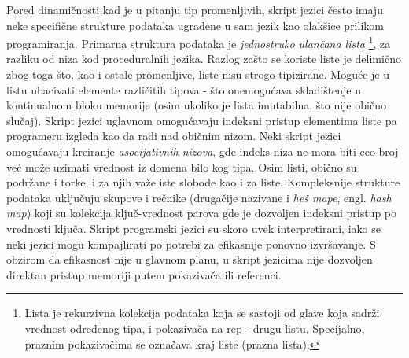 Pored dinamičnosti kad je u pitanju tip promenljivih, skript jezici često imaju neke specifične strukture podataka ugrađene u sam jezik kao olakšice prilikom programiranja. Primarna struktura podataka je \emph{jednostruko ulančana lista} \footnote{Lista je rekurzivna kolekcija podataka koja se sastoji od glave koja sadrži vrednost određenog tipa, i pokazivača na rep - drugu listu. Specijalno, praznim pokazivačima se označava kraj liste (prazna lista).}, za razliku od niza kod proceduralnih jezika. Razlog zašto se koriste liste je delimično zbog toga što, kao i ostale promenljive, liste nisu strogo tipizirane. Moguće je u listu ubacivati elemente različitih tipova - što onemogućava skladištenje u kontinualnom bloku memorije (osim ukoliko je lista imutabilna, što nije obično slučaj). Skript jezici uglavnom omogućavaju indeksni pristup elementima liste pa programeru izgleda kao da radi nad običnim nizom. Neki skript jezici omogućavaju kreiranje \emph{asocijativnih nizova}, gde indeks niza ne mora biti ceo broj već može uzimati vrednost iz domena bilo kog tipa. Osim listi, obično su podržane i torke, i za njih važe iste slobode kao i za liste. Kompleksnije strukture podataka uključuju skupove i rečnike (drugačije nazivane i \emph{heš mape}, engl. \emph{hash map}) koji su kolekcija ključ-vrednost parova gde je dozvoljen indeksni pristup po vrednosti ključa. Skript programski jezici su skoro uvek interpretirani, iako se neki jezici mogu kompajlirati po potrebi za efikasnije ponovno izvršavanje. S obzirom da efikasnost nije u glavnom planu, u skript jezicima nije dozvoljen direktan pristup memoriji putem pokazivača ili referenci. 

